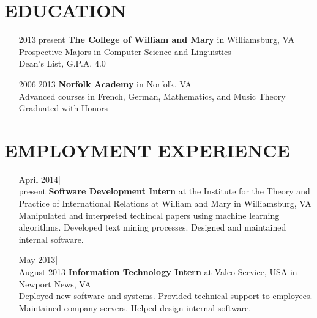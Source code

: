 \documentclass{res}
\begin{document}
\begin{resume}

\section{EDUCATION}          
\vspace{5mm}
\begin{itemize}[font=\itshape,align=parleft,labelwidth=3cm,leftmargin=2cm]
    \item[2013|present]
        \textbf{The College of William and Mary} in Williamsburg, VA \\
        Prospective Majors in Computer Science and Linguistics \\
        Dean's List, G.P.A. 4.0
    \item[2006|2013]
        \textbf{Norfolk Academy} in Norfolk, VA \\
        Advanced courses in French, German, Mathematics, and Music Theory \\
        Graduated with Honors
\end{itemize}

\section{EMPLOYMENT EXPERIENCE}
\vspace{5mm}
\begin{itemize}[font=\itshape,align=parleft,labelwidth=3cm,leftmargin=2cm]
    \item[April 2014|\\present]
        \textbf{Software Development Intern}
        at the Institute for the Theory and Practice of International Relations
        at William and Mary
        in Williamsburg, VA
        \vspace{1mm}
        \\
        Manipulated and interpreted techincal papers using machine learning algorithms.
        Developed text mining processes.
        Designed and maintained internal software.
    \item[May 2013|\\August 2013]
        \textbf{Information Technology Intern}
        at Valeo Service, USA
        in Newport News, VA
        \vspace{1mm}
        \\
        Deployed new software and systems.
        Provided technical support to employees.
        Maintained company servers.
        Helped design internal software.
\end{itemize}


\end{resume}
\end{document}
